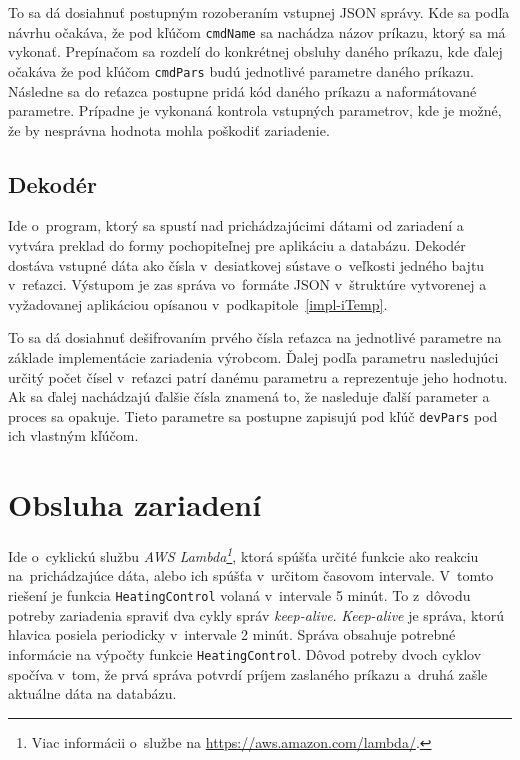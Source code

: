 To sa dá dosiahnuť postupným rozoberaním vstupnej JSON správy. Kde sa  podľa návrhu očakáva, že pod kľúčom \texttt{cmdName} sa nachádza názov príkazu, ktorý sa má vykonať. 
Prepínačom sa rozdelí do konkrétnej obsluhy daného príkazu, kde ďalej očakáva že pod kľúčom \texttt{cmdPars} budú jednotlivé parametre daného príkazu. Následne sa do reťazca postupne pridá kód daného príkazu a naformátované parametre. Prípadne je vykonaná kontrola vstupných parametrov, kde je možné, že by nesprávna hodnota mohla poškodiť zariadenie.

\subsection*{Dekodér}
Ide o~program, ktorý sa spustí nad prichádzajúcimi dátami od zariadení a vytvára preklad do formy pochopiteľnej pre aplikáciu a databázu. Dekodér dostáva vstupné dáta ako čísla v~desiatkovej sústave o~veľkosti jedného bajtu v~reťazci. Výstupom je zas správa vo~formáte JSON v~štruktúre vytvorenej a vyžadovanej aplikáciou opísanou v~podkapitole~\ref{impl-iTemp}.

To sa dá dosiahnuť dešifrovaním prvého čísla reťazca na jednotlivé parametre na základe implementácie zariadenia výrobcom. Ďalej podľa parametru nasledujúci určitý počet čísel v~reťazci patrí danému parametru a reprezentuje jeho hodnotu. Ak sa ďalej nachádzajú ďalšie čísla znamená to, že nasleduje ďalší parameter a proces sa opakuje. Tieto parametre sa postupne zapisujú pod kľúč \texttt{devPars} pod ich vlastným kľúčom.

\section{Obsluha zariadení}\label{impl-Lambda}
Ide o~cyklickú službu \emph{AWS Lambda\footnote{Viac informácii o~službe na \url{https://aws.amazon.com/lambda/}.}}, ktorá spúšťa určité funkcie ako reakciu na~prichádzajúce dáta, alebo ich spúšťa v~určitom časovom intervale. V~tomto riešení je funkcia \texttt{HeatingControl} volaná v~intervale 5 minút. To z~dôvodu potreby zariadenia spraviť dva cykly správ \emph{keep-alive}. \emph{Keep-alive} je správa, ktorú hlavica posiela periodicky v~intervale 2 minút. Správa obsahuje potrebné informácie na výpočty funkcie \texttt{HeatingControl}. Dôvod potreby dvoch cyklov spočíva v~tom, že prvá správa potvrdí príjem zaslaného príkazu a~druhá zašle aktuálne dáta na databázu.

